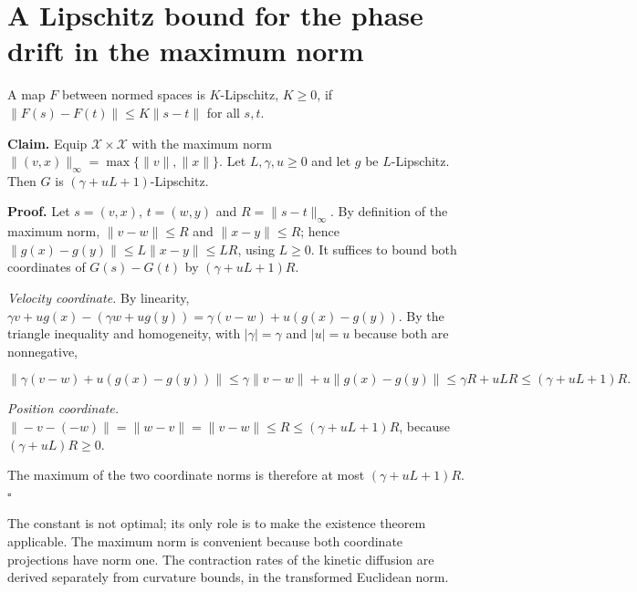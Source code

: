\documentclass[11pt,a4paper]{article}
\begin{document}
\section{\texorpdfstring{A Lipschitz bound for the phase drift in the maximum norm}{A Lipschitz bound for the phase drift in the maximum norm}}


A map \(F\) between normed spaces is \(K\)-Lipschitz, \(K\ge0\), if \(\|F(s)-F(t)\|\le K\|s-t\|\) for all \(s,t\).




\textbf{Claim.} Equip \(\mathcal X\times\mathcal X\) with the maximum norm \(\|(v,x)\|_\infty=\max\{\|v\|,\|x\|\}\). Let \(L,\gamma,u\ge0\) and let \(g\) be \(L\)-Lipschitz. Then \(G\) is \((\gamma+uL+1)\)-Lipschitz.




\textbf{Proof.} Let \(s=(v,x)\), \(t=(w,y)\) and \(R=\|s-t\|_\infty\). By definition of the maximum norm, \(\|v-w\|\le R\) and \(\|x-y\|\le R\); hence \(\|g(x)-g(y)\|\le L\|x-y\|\le LR\), using \(L\ge0\). It suffices to bound both coordinates of \(G(s)-G(t)\) by \((\gamma+uL+1)R\).




\emph{Velocity coordinate.} By linearity, \(\gamma v+ug(x)-(\gamma w+ug(y))=\gamma(v-w)+u(g(x)-g(y))\). By the triangle inequality and homogeneity, with \(|\gamma|=\gamma\) and \(|u|=u\) because both are nonnegative,


\[\bigl\|\gamma(v-w)+u(g(x)-g(y))\bigr\|\le\gamma\|v-w\|+u\|g(x)-g(y)\|\le\gamma R+uLR\le(\gamma+uL+1)R .\]


\emph{Position coordinate.} \(\|-v-(-w)\|=\|w-v\|=\|v-w\|\le R\le(\gamma+uL+1)R\), because \((\gamma+uL)R\ge0\).




The maximum of the two coordinate norms is therefore at most \((\gamma+uL+1)R\). \(\square\)




The constant is not optimal; its only role is to make the existence theorem applicable. The maximum norm is convenient because both coordinate projections have norm one. The contraction rates of the kinetic diffusion are derived separately from curvature bounds, in the transformed Euclidean norm.
\end{document}
